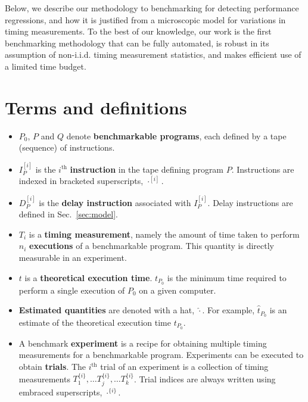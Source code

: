 \documentclass[conference]{IEEEtran}
\begin{document}
Below, we describe our methodology to benchmarking for detecting performance regressions,
and how it is justified from a microscopic model for variations in timing measurements. To
the best of our knowledge, our work is the first benchmarking methodology that can be fully
automated, is robust in its assumption of non-i.i.d. timing measurement statistics, and
makes efficient use of a limited time budget.

\section{Terms and definitions}
\label{sec:notation}

\begin{itemize}
    \item
    $P_0$, $P$ and $Q$ denote \textbf{benchmarkable programs}, each defined by
    a tape (sequence) of instructions.

    \item
    $I^{[i]}_{P}$ is the $i^{\textrm{th}}$ \textbf{instruction} in the tape
    defining program $P$.
    Instructions are indexed in bracketed superscripts, $\cdot^{[i]}$.

    \item
    $D^{[i]}_{P}$ is the \textbf{delay instruction} associated with $I^{[i]}_{P}$.
    Delay instructions are defined in Sec.~\ref{sec:model}.

    \item
    $T_i$ is a \textbf{timing measurement}, namely the amount of time taken to
    perform $n_i$ \textbf{executions} of a benchmarkable program. This quantity
    is directly measurable in an experiment.

    \item
    $t$ is a \textbf{theoretical execution time}.
    $t_{P_0}$ is the minimum time required to perform a single execution of
    $P_0$ on a given computer.

    \item
    \textbf{Estimated quantities} are denoted with a hat, $\hat\cdot$.
    For example, $\hat{t}_{P_0}$ is an estimate of the theoretical execution
    time $t_{P_0}$.

    \item
    A benchmark \textbf{experiment} is a recipe for obtaining multiple timing
    measurements for a benchmarkable program. Experiments can be executed to
obtain \textbf{trials}. The
    $i^{\textrm{th}}$ trial of an experiment is a collection of timing measurements
    $T^{\{i\}}_1, \dots T^{\{i\}}_j, \dots T^{\{i\}}_k$. Trial indices are always
    written using embraced superscripts, $\cdot^{\{i\}}$.


\end{itemize}
\end{document}
